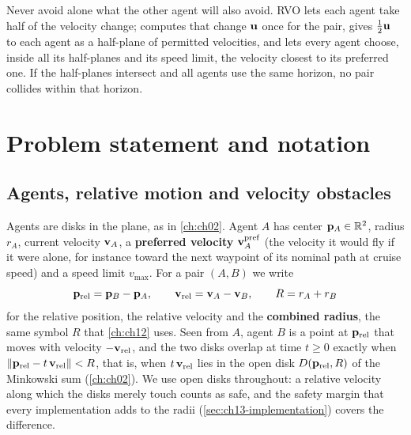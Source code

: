 \begin{keyidea}
Never avoid alone what the other agent will also avoid. RVO lets each agent
take half of the velocity change; \orca computes that change $\mathbf{u}$ once
for the pair, gives $\tfrac12\mathbf{u}$ to each agent as a half-plane of
permitted velocities, and lets every agent choose, inside all its half-planes
and its speed limit, the velocity closest to its preferred one. If the
half-planes intersect and all agents use the same horizon, no pair collides
within that horizon.
\end{keyidea}

\section{Problem statement and notation}
\label{sec:ch13-problem}

\subsection{Agents, relative motion and velocity obstacles}
\label{sec:ch13-vo}

Agents are disks in the plane, as in \cref{ch:ch02}. Agent $A$ has center
$\mathbf{p}_A \in \mathbb{R}^2$, radius $r_A$, current velocity $\mathbf{v}_A$, a
\textbf{preferred velocity} $\mathbf{v}_A^{\mathrm{pref}}$
(the velocity it would fly if it were alone, for instance toward the next
waypoint of its nominal path at cruise speed) and a speed limit
$v_{\max}$. For a pair $(A, B)$ we write
\begin{equation}
  \mathbf{p}_{\mathrm{rel}} = \mathbf{p}_B - \mathbf{p}_A, \qquad
  \mathbf{v}_{\mathrm{rel}} = \mathbf{v}_A - \mathbf{v}_B, \qquad
  R = r_A + r_B
  \label{eq:ch13-relative}
\end{equation}
for the relative position, the relative velocity and the
\textbf{combined radius}, the same symbol $R$ that
\cref{ch:ch12} uses.
Seen from $A$, agent $B$ is a point at $\mathbf{p}_{\mathrm{rel}}$ that moves with
velocity $-\mathbf{v}_{\mathrm{rel}}$, and the two disks overlap at time $t \ge 0$
exactly when $\left\lVert \mathbf{p}_{\mathrm{rel}} - t\,\mathbf{v}_{\mathrm{rel}} \right\rVert < R$,
that is, when $t\,\mathbf{v}_{\mathrm{rel}}$ lies in the open disk
$D(\mathbf{p}_{\mathrm{rel}},R)$ of the Minkowski sum
(\cref{ch:ch02}). We use open disks throughout: a relative
velocity along which the disks merely touch counts as safe, and the safety
margin that every implementation adds to the radii
(\cref{sec:ch13-implementation}) covers the difference.

